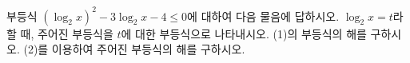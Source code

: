 부등식 $(\log_2 x)^2-3\log_2 x-4\le 0$에 대하여 다음 물음에 답하시오.
 $\log_2 x=t$라 할 때, 주어진 부등식을 $t$에 대한 부등식으로 나타내시오.
 (1)의 부등식의 해를 구하시오.
 (2)를 이용하여 주어진 부등식의 해를 구하시오.
